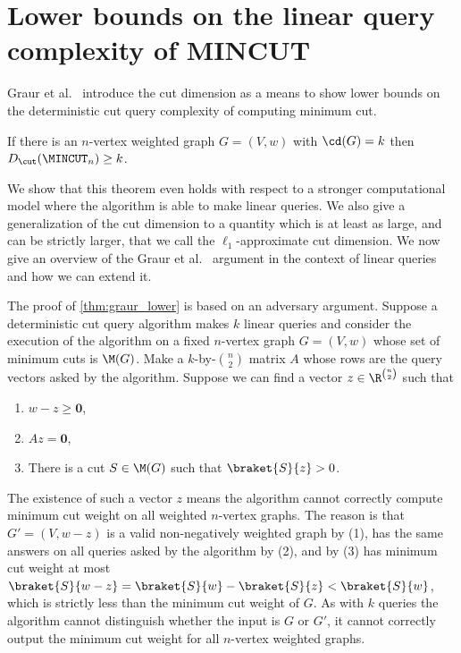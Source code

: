 %

\section{Lower bounds on the linear query complexity of MINCUT}\label{sec:min-query}
Graur et al.~\cite{GPRW20} introduce the cut dimension as a means to show lower bounds on the
deterministic cut query complexity of computing minimum cut.

\begin{theorem}
\label{thm:graur_lower}
If there is an $n$-vertex {weighted graph $G = (V,w)$} with $\cd(G) = k$ then $D_\cut(\MINCUT_n) \ge k$.
\end{theorem}

We show that this theorem even holds with respect to a stronger computational model where the algorithm is able to
make linear queries.  We also give a generalization of the cut dimension to a quantity which is at least as large,
and can be strictly larger, that we call the $\ell_1$-approximate cut dimension.  We now give an overview of the Graur et al.\  \cite{GPRW20}
argument in the context of linear queries and how we can extend it.

The proof of \cref{thm:graur_lower} is based on an adversary argument.  Suppose a deterministic cut query algorithm makes $k$ linear queries
and consider the execution of the algorithm on a fixed $n$-vertex graph $G = (V,w)$ whose set of minimum cuts is $\M(G)$.
Make a $k$-by-$\binom{n}{2}$ matrix ${A}$ whose rows are the query vectors asked by the algorithm. Suppose we can find a vector
${z} \in \R^{\binom{n}{2}}$ such that
\begin{enumerate}
  \item $w-{z} \ge \mathbf{0}$,
  \item ${A}{z} = \mathbf{0}$,
  \item There is a cut $S \in \M(G)$ such that $\braket{S}{z} > 0$.
\end{enumerate}
The existence of such a vector $z$ means the algorithm cannot correctly compute minimum cut
weight on all weighted $n$-vertex graphs.  The reason is that $G' = (V,w-z)$
is a valid non-negatively weighted graph by (1), has the same answers on all queries asked by the algorithm by (2),
and by (3) has minimum cut weight at most $\braket{S}{w-z} = \braket{S}{w} - \braket{S}{z} < \braket{S}{w}$,
which is strictly less than the minimum cut weight of $G$. As with $k$ queries the algorithm cannot distinguish whether the input is $G$ or $G'$, it cannot correctly output the minimum cut weight for all $n$-vertex weighted graphs.

